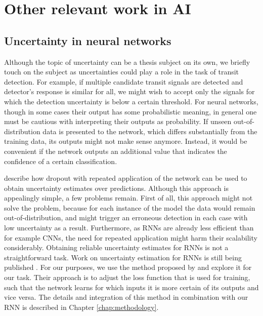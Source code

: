 
\section{Other relevant work in AI}
\red{[TODO]}

\subsection{Uncertainty in neural networks}
Although the topic of uncertainty can be a thesis subject on its own, we briefly touch on the subject as uncertainties could play a role in the task of transit detection. For example, if multiple candidate transit signals are detected and detector's response is similar for all, we might wish to accept only the signals for which the detection uncertainty is below a certain threshold. For neural networks, though in some cases their output has some probabilistic meaning, in general one must be cautious with interpreting their outputs as probability. If unseen out-of-distribution data is presented to the network, which differs substantially from the training data, its outputs might not make sense anymore.  Instead, it would be convenient if the network outputs an additional value that indicates the confidence of a certain classification. 

\cite{gal2016dropout} describe how dropout with repeated application of the network can be used to obtain uncertainty estimates over predictions. Although this approach is appealingly simple, a few problems remain. First of all, this approach might not solve the problem, because for each instance of the model the data would remain out-of-distribution, and might trigger an erroneous detection in each case with low uncertainty as a result. Furthermore, as RNNs are already less efficient than for example CNNs, the need for repeated application might harm their scalability considerably. Obtaining reliable uncertainty estimates for RNNs is not a straightforward task. Work on uncertainty estimation for RNNs is still being published \citep{alaa2020frequentist, hwang2020sampling, wang2020uncertainty}. For our purposes, we use the method proposed by \cite{devries2018learning} and explore it for our task. Their approach is to adjust the loss function that is used for training, such that the network learns for which inputs it is more certain of its outputs and vice versa. The details and integration of this method in combination with our RNN is described in Chapter \ref{chap:methodology}.



